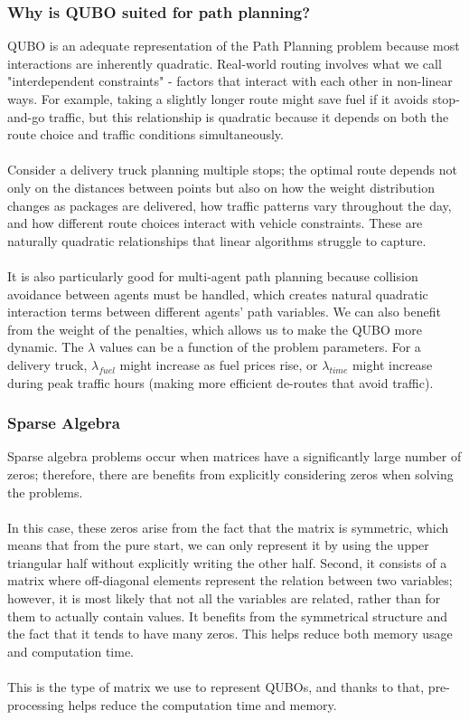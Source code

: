 \documentclass[11pt]{article}
\begin{document}
\subsubsection{Why is QUBO suited for path planning?}

QUBO is an adequate representation of the Path Planning problem because most interactions are inherently quadratic. Real-world routing involves what we call "interdependent constraints" - factors that interact with each other in non-linear ways. For example, taking a slightly longer route might save fuel if it avoids stop-and-go traffic, but this relationship is quadratic because it depends on both the route choice and traffic conditions simultaneously.\\
\\
Consider a delivery truck planning multiple stops; the optimal route depends not only on the distances between points but also on how the weight distribution changes as packages are delivered, how traffic patterns vary throughout the day, and how different route choices interact with vehicle constraints. These are naturally quadratic relationships that linear algorithms struggle to capture.\\
\\
It is also particularly good for multi-agent path planning because collision avoidance between agents must be handled, which creates natural quadratic interaction terms between different agents' path variables. We can also benefit from the weight of the penalties, which allows us to make the QUBO more dynamic. The \(\lambda\) values can be a function of the problem parameters. For a delivery truck, \( \lambda_{fuel}\) might increase as fuel prices rise, or \(\lambda_{time}\) might increase during peak traffic hours (making more efficient de-routes that avoid traffic).

\subsubsection{Sparse Algebra}

Sparse algebra problems occur when matrices have a significantly large number of zeros; therefore, there are benefits from explicitly considering zeros when solving the problems.\\
\\
In this case, these zeros arise from the fact that the matrix is symmetric, which means that from the pure start, we can only represent it by using the upper triangular half without explicitly writing the other half. Second, it consists of a matrix where off-diagonal elements represent the relation between two variables; however, it is most likely that not all the variables are related, rather than for them to actually contain values. It benefits from the symmetrical structure and the fact that it tends to have many zeros. This helps reduce both memory usage and computation time.\\
\\
This is the type of matrix we use to represent QUBOs, and thanks to that, pre-processing helps reduce the computation time and memory.
\end{document}
